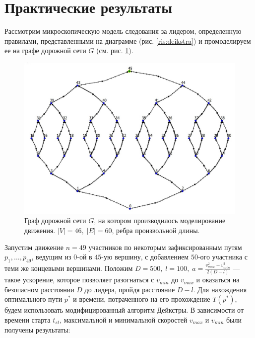 \documentclass[12pt, a4paper]{article}
\begin{document}
\newpage
\section{Практические результаты}
Рассмотрим микроскопическую модель следования за лидером, определенную правилами, представленными на диаграмме (рис. \ref{ris:deikstra}) и промоделируем ее на графе дорожной сети $G$ (см. рис. \ref{ris:Graph}).

\begin{figure}[H]
	\centering
	\includegraphics[scale=0.25]{Graph_N.jpg}
	\caption{Граф дорожной сети $G$, на котором производилось моделирование движения. $|V| = 46, \; |E| = 60$, ребра произвольной длины.}
	\label{ris:Graph}
\end{figure}

Запустим движение $n = 49$ участников по некоторым зафиксированным путям $p_1, \dots, p_{49}$, ведущим из $0$-ой в $45$-ую вершину, с добавлением $50$-ого участника с теми же концевыми вершинами. Положим $D = 500, \; l = 100, \; a = \frac{v^2_{max}-v^2_{min}}{2(D-l)}$ --- такое ускорение, которое позволяет разогнаться с $v_{min}$ до $v_{max}$ и оказаться на безопасном расстоянии $D$ до лидера, пройдя расстояние $D-l$. Для нахождения оптимального пути $p^*$ и времени, потраченного на его прохождение $T(p^*)$, будем использовать модифицированный алгоритм Дейкстры. В зависимости от времени старта $t_{st}$, максимальной и минимальной скоростей $v_{max}$ и $v_{min}$ были получены результаты:
\end{document}
